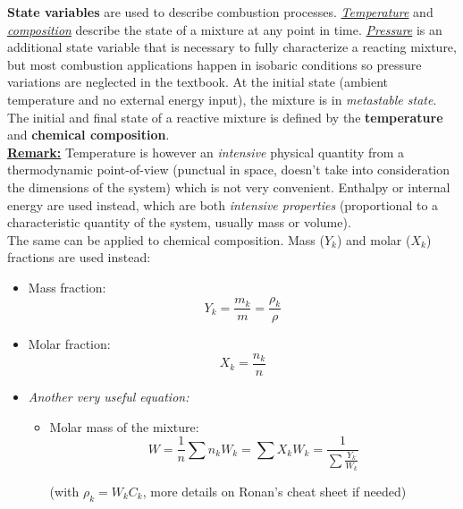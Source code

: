 \documentclass[a4paper,11pt]{article}
\begin{document}
\textbf{State variables} are used to describe combustion processes. \underline{\emph{Temperature}} and \underline{\emph{composition}} describe the state of a mixture at any point in time. \underline{\emph{Pressure}} is an additional state variable that is necessary to fully characterize a reacting mixture, but most combustion applications happen in isobaric conditions so pressure variations are neglected in the textbook.
At the initial state (ambient temperature and no external energy input), the mixture is in \emph{metastable state}. The initial and final state of a reactive mixture is defined by the \textbf{temperature} and \textbf{chemical composition}.
\vspace{4pt}
\\
\underline{\textbf{\small Remark:}} Temperature is however an \textit{intensive} physical quantity from a thermodynamic point-of-view (punctual in space, doesn't take into consideration the dimensions of the system) which is not very convenient. Enthalpy or internal energy are used instead, which are both \textit{intensive properties} (proportional to a characteristic quantity of the system, usually mass or volume).\\
The same can be applied to chemical composition. Mass ($Y_k$) and molar ($X_k$) fractions are used instead:
\begin{itemize}
    \item Mass fraction: \[Y_k = \frac{m_k}{m} = \frac{\rho_k}{\rho}\]
    \item Molar fraction: \[X_k = \frac{n_k}{n}\]
    \item \emph{Another very useful equation:}
    \begin{itemize}
        \item Molar mass of the mixture:
            \[W = \frac{1}{n} \sum n_kW_k = \sum X_k W_k = \frac{1}{\sum \frac{Y_k}{W_k}}\]
    \begin{center}
    (with $\rho_k = W_k C_k$, more details on Ronan's cheat sheet if needed)
    \end{center}
    \end{itemize}
\end{itemize}
\end{document}
